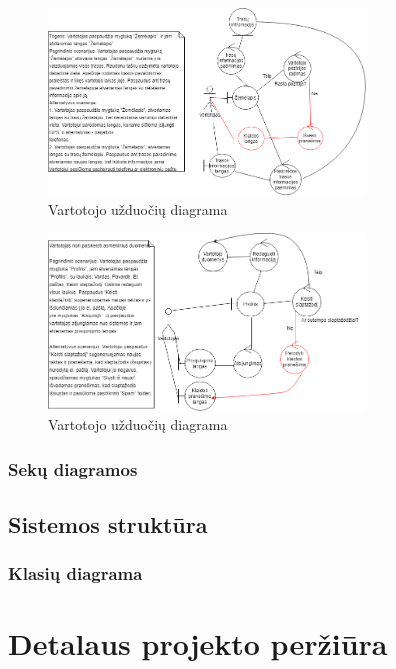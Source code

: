 \documentclass[oneside]{VUMIFPSkursinis}
\begin{document}
			\begin{figure}[h]
    				\centering
    				\includegraphics[width=0.75\textwidth]{rob13.png}
    				\caption{Vartotojo užduočių diagrama}
    				\label{fig:VartotojoUseCasel}
			\end{figure}

			\begin{figure}[h]
    				\centering
    				\includegraphics[width=0.75\textwidth]{rob14.png}
    				\caption{Vartotojo užduočių diagrama}
    				\label{fig:VartotojoUseCasel}
			\end{figure}

\pagebreak
\pagebreak
\pagebreak

		\subsubsection{Sekų diagramos}
	\subsection{Sistemos struktūra}
		\subsubsection{Klasių diagrama}
	

\section{Detalaus projekto peržiūra}
\end{document}
